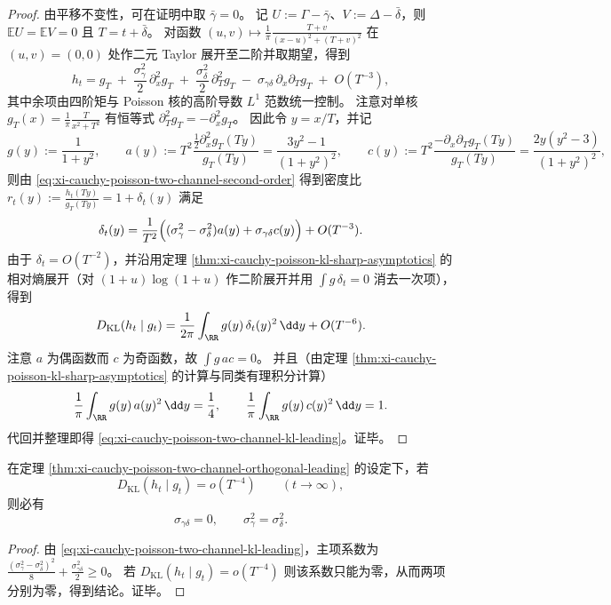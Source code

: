 \begin{proof}
由平移不变性，可在证明中取 \(\bar\gamma=0\)。
记 \(U:=\Gamma-\bar\gamma\)、\(V:=\Delta-\bar\delta\)，则 \(\mathbb{E}U=\mathbb{E}V=0\) 且 \(T=t+\bar\delta\)。
对函数 \((u,v)\mapsto \frac{1}{\pi}\frac{T+v}{(x-u)^2+(T+v)^2}\) 在 \((u,v)=(0,0)\) 处作二元 Taylor 展开至二阶并取期望，得到
\begin{equation}\label{eq:xi-cauchy-poisson-two-channel-second-order}
h_t
=g_T
\;+\;\frac{\sigma_\gamma^2}{2}\,\partial_x^2 g_T
\;+\;\frac{\sigma_\delta^2}{2}\,\partial_T^2 g_T
\;-\;\sigma_{\gamma\delta}\,\partial_x\partial_T g_T
\;+\;O(T^{-3}),
\end{equation}
其中余项由四阶矩与 Poisson 核的高阶导数 \(L^1\) 范数统一控制。
注意对单核 \(g_T(x)=\frac{1}{\pi}\frac{T}{x^2+T^2}\) 有恒等式 \(\partial_T^2 g_T=-\partial_x^2 g_T\)。
因此令 \(y=x/T\)，并记
\[
g(y):=\frac{1}{1+y^2},\qquad
a(y):=T^2\frac{\tfrac12\partial_x^2 g_T(Ty)}{g_T(Ty)}=\frac{3y^2-1}{(1+y^2)^2},\qquad
c(y):=T^2\frac{-\partial_x\partial_T g_T(Ty)}{g_T(Ty)}=\frac{2y(y^2-3)}{(1+y^2)^2},
\]
则由 \eqref{eq:xi-cauchy-poisson-two-channel-second-order} 得到密度比 \(r_t(y):=\frac{h_t(Ty)}{g_T(Ty)}=1+\delta_t(y)\) 满足
\[
\delta_t(y)
=\frac{1}{T^2}\Bigl((\sigma_\gamma^2-\sigma_\delta^2)a(y)+\sigma_{\gamma\delta}c(y)\Bigr)+O(T^{-3}).
\]
由于 \(\delta_t=O(T^{-2})\)，并沿用定理 \ref{thm:xi-cauchy-poisson-kl-sharp-asymptotics} 的相对熵展开（对 \((1+u)\log(1+u)\) 作二阶展开并用 \(\int g\,\delta_t=0\) 消去一次项），得到
\[
D_{\mathrm{KL}}(h_t\mid g_t)
=\frac{1}{2\pi}\int_{\RR} g(y)\,\delta_t(y)^2\,\dd y+O(T^{-6}).
\]
注意 \(a\) 为偶函数而 \(c\) 为奇函数，故 \(\int g\,a c=0\)。
并且（由定理 \ref{thm:xi-cauchy-poisson-kl-sharp-asymptotics} 的计算与同类有理积分计算）
\[
\frac{1}{\pi}\int_{\RR} g(y)\,a(y)^2\,\dd y=\frac14,
\qquad
\frac{1}{\pi}\int_{\RR} g(y)\,c(y)^2\,\dd y=1.
\]
代回并整理即得 \eqref{eq:xi-cauchy-poisson-two-channel-kl-leading}。证毕。
\end{proof}



\begin{corollary}[双通道主项消失的刚性条件]\label{cor:xi-cauchy-poisson-two-channel-rigidity}
在定理 \ref{thm:xi-cauchy-poisson-two-channel-orthogonal-leading} 的设定下，若
\[
D_{\mathrm{KL}}(h_t\mid g_t)=o(T^{-4})\qquad(t\to\infty),
\]
则必有
\[
\sigma_{\gamma\delta}=0,\qquad \sigma_\gamma^2=\sigma_\delta^2.
\]
\end{corollary}

\begin{proof}
由 \eqref{eq:xi-cauchy-poisson-two-channel-kl-leading}，主项系数为
\(
\frac{(\sigma_\gamma^2-\sigma_\delta^2)^2}{8}+\frac{\sigma_{\gamma\delta}^2}{2}\ge 0
\)。
若 \(D_{\mathrm{KL}}(h_t\mid g_t)=o(T^{-4})\) 则该系数只能为零，从而两项分别为零，得到结论。证毕。
\end{proof}

\endinput
